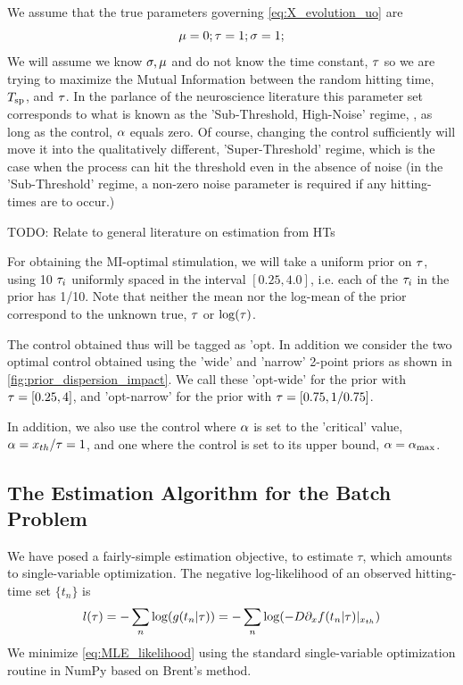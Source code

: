 \documentclass{article}
\begin{document}
We assume that the true parameters governing \cref{eq:X_evolution_uo} are
$$ {\mu } = 0; { \tau } = 1; {\sigma } = 1;
$$ We will assume we know ${\sigma }, {\mu }$ and do not know the time constant, ${ \tau }$ so
we are trying to maximize the Mutual Information between the random hitting
time, ${ T_{\textrm{sp} } }$, and ${ \tau }$. In the parlance of the neuroscience literature this
parameter set corresponds to what is known as the 'Sub-Threshold, High-Noise'
regime, \cite{Iolov2013}, as long as the control, ${\alpha}$ equals zero. Of course,
changing the control sufficiently will move it into the qualitatively different,
'Super-Threshold' regime, which is the case when the process can hit the
threshold even in the absence of noise (in the 'Sub-Threshold' regime, a
non-zero noise parameter is required if any hitting-times are to occur.)

TODO: Relate to general literature on estimation from HTs
 
 For obtaining the MI-optimal stimulation, we will take a uniform prior on
 ${ \tau }$, using 10 ${ \tau }_i$ uniformly spaced in the interval $[0.25, 4.0]$, i.e.
 each of the ${ \tau }_i$ in the prior has 1/10. Note that neither the mean nor the
 log-mean of the prior correspond to the unknown true, ${ \tau }$ or $\log({ \tau })$.
 
The control obtained thus will be tagged as 'opt. In addition we consider the
two optimal control obtained using the 'wide' and 'narrow' 2-point priors as
shown in \cref{fig:prior_dispersion_impact}. We call these 'opt-wide' for the
prior with ${ \tau } =  [0.25, 4]$, and 'opt-narrow' for the prior with  ${ \tau } =  
[0.75, 1/0.75]$.  

In addition, we also use the control where ${\alpha}$ is set to the 'critical' value,
${\alpha} = { x_{th} }/{ \tau } = 1$, and one where the control is set to its upper
bound, ${\alpha} = { {\alpha}_{\textrm{max}} }$.

\subsection{The Estimation Algorithm for the Batch Problem}
We have posed a fairly-simple estimation objective, to estimate $\tau$, which
amounts to single-variable optimization. The negative log-likelihood of an
observed hitting-time set $\{t_n\}$ is
\begin{equation}
l({ \tau }) = - \sum_n \log ( g(t_n | { \tau }) ) =  - \sum_n \log ( -D {\partial}_x f(t_n |
{ \tau }) |_{{ x_{th} }} )
\label{eq:MLE_likelihood}
\end{equation}
We minimize \cref{eq:MLE_likelihood} using the standard single-variable
optimization routine in NumPy based on Brent's method.
\end{document}
